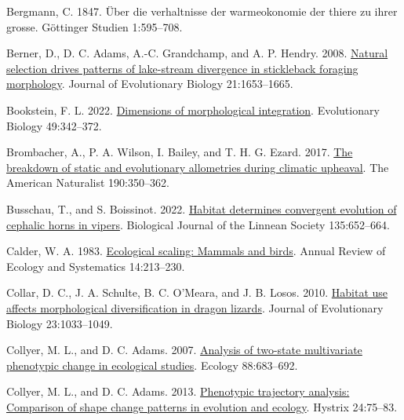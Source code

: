 \documentclass[
  11pt,
]{article}
\newlength{\cslhangindent}
\newlength{\cslentryspacingunit} %
\newenvironment{CSLReferences}[2] %
 {%
  \setlength{\parindent}{0pt}
  \ifodd #1
  \let\oldpar\par
  \def\par{\hangindent=\cslhangindent\oldpar}
  \fi
  \setlength{\parskip}{#2\cslentryspacingunit}
 }%
 {}
\begin{document}
\begin{CSLReferences}{1}{0}
\leavevmode{}%
Bergmann, C. 1847. {Ü}ber die verhaltnisse der warmeokonomie der thiere
zu ihrer grosse. G{ö}ttinger Studien 1:595--708.

\leavevmode{}%
Berner, D., D. C. Adams, A.-C. Grandchamp, and A. P. Hendry. 2008.
\href{https://doi.org/10.1111/j.1420-9101.2008.01583.x}{Natural
selection drives patterns of lake-stream divergence in stickleback
foraging morphology}. Journal of Evolutionary Biology 21:1653--1665.

\leavevmode{}%
Bookstein, F. L. 2022.
\href{https://doi.org/10.1007/s11692-022-09574-0}{Dimensions of
morphological integration}. Evolutionary Biology 49:342--372.

\leavevmode{}%
Brombacher, A., P. A. Wilson, I. Bailey, and T. H. G. Ezard. 2017.
\href{https://doi.org/10.1086/692570}{The breakdown of static and
evolutionary allometries during climatic upheaval}. The American
Naturalist 190:350--362.

\leavevmode{}%
Busschau, T., and S. Boissinot. 2022.
\href{https://doi.org/10.1093/biolinnean/blac008}{{Habitat determines
convergent evolution of cephalic horns in vipers}}. Biological Journal
of the Linnean Society 135:652--664.

\leavevmode{}%
Calder, W. A. 1983.
\href{https://doi.org/10.1146/annurev.es.14.110183.001241}{Ecological
scaling: Mammals and birds}. Annual Review of Ecology and Systematics
14:213--230.

\leavevmode{}%
Collar, D. C., J. A. Schulte, B. C. O'Meara, and J. B. Losos. 2010.
\href{https://doi.org/10.1111/j.1420-9101.2010.01971.x}{Habitat use
affects morphological diversification in dragon lizards}. Journal of
Evolutionary Biology 23:1033--1049.

\leavevmode{}%
Collyer, M. L., and D. C. Adams. 2007.
\href{https://doi.org/10.1890/06-0727}{Analysis of two-state
multivariate phenotypic change in ecological studies}. Ecology
88:683--692.

\leavevmode{}%
Collyer, M. L., and D. C. Adams. 2013.
\href{https://doi.org/10.4404/hystrix-24.1-6298}{Phenotypic trajectory
analysis: Comparison of shape change patterns in evolution and ecology}.
Hystrix 24:75--83.


\end{CSLReferences}
\end{document}
